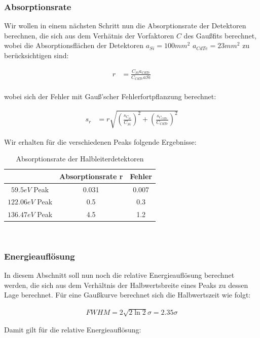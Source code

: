 \documentclass[12pt]{article}
\begin{document}
\subsubsection{Absorptionsrate}

Wir wollen in einem nächsten Schritt nun die Absorptionsrate der Detektoren berechnen, die sich aus dem Verhätnis der Vorfaktoren $C$ des Gaußfits berechnet, wobei die Absorptionsflächen der Detektoren $a_{Si}=100mm^2$ $a_{CdTe}=23mm^2$ zu berücksichtigen sind:

\begin{align*}
r&=\frac{C_{Si}a_{CdTe}}{C_{CdTe}a{Si}}\\
\end{align*}

wobei sich der Fehler mit Gauß'scher Fehlerfortpflanzung berechnet:

\begin{align*}
s_r&=r \sqrt{\left(\frac{s_{C_{Si}}}{C_{Si}}\right)^2+\left(\frac{s_{C_{CdTe}}}{C_{CdTe}}\right)^2}
\end{align*}

Wir erhalten für die verschiedenen Peaks folgende Ergebnisse:
\begin{table}[h!]

{\centering{}
\begin{tabular}{c||c|c}
					& Absorptionsrate r & Fehler	\\ \hline\hline
$59.5 eV$ Peak		& 0.031			    & 0.007		\\ \hline
$122.06 eV$ Peak	& 0.5 			    & 0.3	\\ \hline
$136.47 eV$ Peak	& 4.5 		     	& 1.2
\end{tabular}\\}
 \caption{Absorptionsrate
  der Halbleiterdetektoren}
\end{table}
\subsubsection{Energieauflösung}
In diesem Abschnitt soll nun noch die relative Energieauflösung berechnet werden, die sich aus dem Verhältnis der Halbwertsbreite eines Peaks zu dessen Lage berechnet. Für eine Gaußkurve berechnet sich die Halbwertszeit wie folgt:

\begin{align*}
FWHM = 2\sqrt{2\ln2}\sigma = 2.35 \sigma
\end{align*}

Damit gilt für die relative Energieauflösung:
\end{document}
